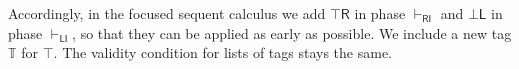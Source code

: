 \documentclass[submission,copyright,creativecommons]{eptcs}
\theoremstyle{definition}
\newcommand{\tr}{\otimes \mathsf{R}}
\newcommand{\andr}{\land \mathsf{R}}
\newcommand{\orl}{\lor \mathsf{L}}
\newcommand{\orrone}{\lor \mathsf{R}_{1}}
\newcommand{\orrtwo}{\lor \mathsf{R}_{2}}
\newcommand{\RI}{\mathsf{RI}}
\newcommand{\LI}{\mathsf{LI}}
\newcommand{\tT}{\mathbb{T}}
\newcommand{\topr}{\top \mathsf{R}}
\newcommand{\botl}{\bot \mathsf{L}}
\begin{document}
Accordingly, in the focused sequent calculus we add $\topr$ in phase $\vdash_\RI$ and $\botl$ in phase $\vdash_\LI$, so  that they can be applied as early as possible.
We include a new tag $\tT$ for $\top$. The validity condition for lists of tags stays the same.
\end{document}
